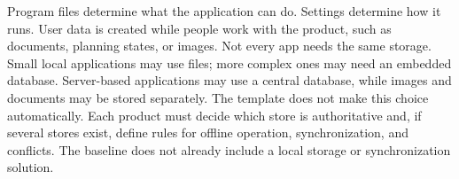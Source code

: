 \begin{beginnerstatement}

Program files determine what the application can do. Settings determine how
it runs. User data is created while people work with the product, such as
documents, planning states, or images. Not every app needs the same storage.
Small local applications may use files; more complex ones may need an embedded
database. Server-based applications may use a central database, while images
and documents may be stored separately. The template does not make this
choice automatically. Each product must decide which store is authoritative
and, if several stores exist, define rules for offline operation,
synchronization, and conflicts. The baseline does not already include a local
storage or synchronization solution.

\end{beginnerstatement}
